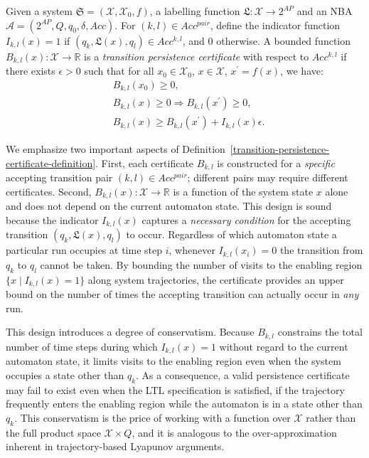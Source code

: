 \begin{definition}
  \label{transition-persistence-certificate-definition}
  Given a system $\mathfrak{S} = (\mathcal{X}, \mathcal{X}_0, f)$, a labelling function $\mathfrak{L}:\mathcal{X} \rightarrow 2^{AP}$ and an NBA $\mathcal{A} = (2^{AP}, Q, q_0, \delta, Acc)$. For $(k, l) \in Acc^{pair}$, define the indicator function $I_{k,l}(x) = 1$ if $(q_k, \mathfrak{L}(x), q_l) \in Acc^{k,l}$, and $0$ otherwise. A bounded function $B_{k, l}(x): \mathcal{X} \rightarrow \mathbb{R}$ is a \emph{transition persistence certificate} with respect to $Acc^{k,l}$ if there exists $\epsilon > 0$ such that for all $x_0 \in \mathcal{X}_0$, $x \in \mathcal{X}$, $x^{\prime} = f(x)$, we have:
  \begin{align}
    &B_{k, l}(x_0) \geq 0, \label{btpc1} \\
    &B_{k, l}(x) \geq 0 \Rightarrow B_{k, l}(x^{\prime}) \geq 0, \label{btpc2} \\
    &B_{k, l}(x) \geq B_{k, l}(x^{\prime}) + I_{k,l}(x)\epsilon. \label{btpc3}
  \end{align}
\end{definition}

We emphasize two important aspects of Definition~\ref{transition-persistence-certificate-definition}. First, each certificate $B_{k,l}$ is constructed for a \emph{specific} accepting transition pair $(k, l) \in Acc^{pair}$; different pairs may require different certificates. Second, $B_{k,l}(x): \mathcal{X} \rightarrow \mathbb{R}$ is a function of the system state $x$ alone and does not depend on the current automaton state. This design is sound because the indicator $I_{k,l}(x)$ captures a \emph{necessary condition} for the accepting transition $(q_k, \mathfrak{L}(x), q_l)$ to occur. Regardless of which automaton state a particular run occupies at time step $i$, whenever $I_{k,l}(x_i) = 0$ the transition from $q_k$ to $q_l$ cannot be taken. By bounding the number of visits to the enabling region $\{x \mid I_{k,l}(x) = 1\}$ along system trajectories, the certificate provides an upper bound on the number of times the accepting transition can actually occur in \emph{any} run.

This design introduces a degree of conservatism. Because $B_{k,l}$ constrains the total number of time steps during which $I_{k,l}(x) = 1$ without regard to the current automaton state, it limits visits to the enabling region even when the system occupies a state other than $q_k$. As a consequence, a valid persistence certificate may fail to exist even when the LTL specification is satisfied, if the trajectory frequently enters the enabling region while the automaton is in a state other than $q_k$. This conservatism is the price of working with a function over $\mathcal{X}$ rather than the full product space $\mathcal{X} \times Q$, and it is analogous to the over-approximation inherent in trajectory-based Lyapunov arguments.

